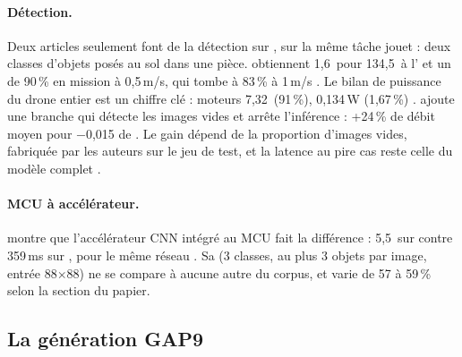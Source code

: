 \paragraph{Détection.} Deux articles seulement font de la détection sur , sur la même
tâche jouet : deux classes d'objets posés au sol dans une pièce.
\citet{arxiv-2301.12175-bio-inspired-autonomous-exploration-policies}\pp{} obtiennent
1,6\, pour 134,5\, à l'  et un  de 90\,\% en
mission à 0,5\,m/s, qui tombe à 83\,\% à 1\,m/s . Le bilan de puissance du
drone entier est un chiffre clé : moteurs 7,32\, (91\,\%),  0,134\,W (1,67\,\%)
. 
\citep{arxiv-2603.28149-blankskip-early-exit-object-detection}\pp{} ajoute une branche qui
détecte les images vides et arrête l'inférence : +24\,\% de débit moyen pour $-$0,015 de
 . Le gain dépend de la proportion d'images vides, fabriquée par les
auteurs sur le jeu de test, et la latence au pire cas reste celle du modèle complet
\deduit.

\paragraph{MCU à accélérateur.} 
\citep{arxiv-2306.00001-tinyissimoyolo-quantized-low-memory-footprint} montre que
l'accélérateur CNN intégré au MCU fait la différence : 5,5\, sur  contre 359\,ms
sur , pour le même réseau . Sa  (3 classes, au plus 3 objets par
image, entrée 88$\times$88) ne se compare à aucune autre du corpus, et varie de 57 à
59\,\% selon la section du papier.

\subsection{La génération GAP9}
\label{sec:gap9}

